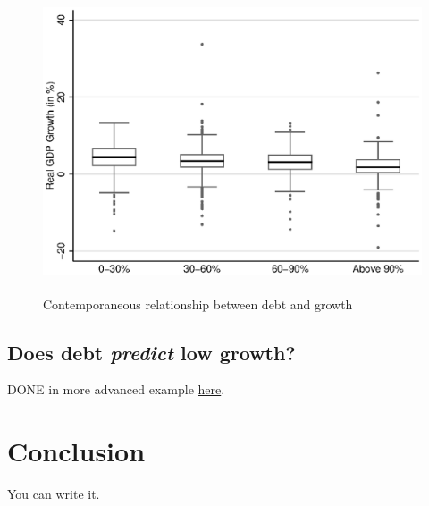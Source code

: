 \documentclass[letterpaper,11pt]{article}
\begin{document}
\begin{figure}[h!]
\centering
\includegraphics[height=3.5in,]{tables_figures/fig_box_annual.eps}
\caption{Contemporaneous relationship between debt and growth}
\end{figure}

\subsection{Does debt \emph{predict} low growth?}

DONE in more advanced example \href{https://github.com/dvorakt/TIER_debt_growth}{here}.

\section{Conclusion}

You can write it. 



\end{document}
